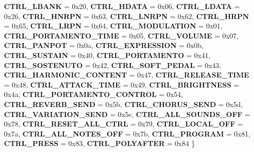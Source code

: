 \begin{DoxyCompactItemize}
{\bfseries C\+T\+R\+L\+\_\+\+L\+B\+A\+NK} = 0x20, 
{\bfseries C\+T\+R\+L\+\_\+\+H\+D\+A\+TA} = 0x06, 
{\bfseries C\+T\+R\+L\+\_\+\+L\+D\+A\+TA} = 0x26, 
\newline
{\bfseries C\+T\+R\+L\+\_\+\+H\+N\+R\+PN} = 0x63, 
{\bfseries C\+T\+R\+L\+\_\+\+L\+N\+R\+PN} = 0x62, 
{\bfseries C\+T\+R\+L\+\_\+\+H\+R\+PN} = 0x65, 
{\bfseries C\+T\+R\+L\+\_\+\+L\+R\+PN} = 0x64, 
\newline
{\bfseries C\+T\+R\+L\+\_\+\+M\+O\+D\+U\+L\+A\+T\+I\+ON} = 0x01, 
{\bfseries C\+T\+R\+L\+\_\+\+P\+O\+R\+T\+A\+M\+E\+N\+T\+O\+\_\+\+T\+I\+ME} = 0x05, 
{\bfseries C\+T\+R\+L\+\_\+\+V\+O\+L\+U\+ME} = 0x07, 
{\bfseries C\+T\+R\+L\+\_\+\+P\+A\+N\+P\+OT} = 0x0a, 
\newline
{\bfseries C\+T\+R\+L\+\_\+\+E\+X\+P\+R\+E\+S\+S\+I\+ON} = 0x0b, 
{\bfseries C\+T\+R\+L\+\_\+\+S\+U\+S\+T\+A\+IN} = 0x40, 
{\bfseries C\+T\+R\+L\+\_\+\+P\+O\+R\+T\+A\+M\+E\+N\+TO} = 0x41, 
{\bfseries C\+T\+R\+L\+\_\+\+S\+O\+S\+T\+E\+N\+U\+TO} = 0x42, 
\newline
{\bfseries C\+T\+R\+L\+\_\+\+S\+O\+F\+T\+\_\+\+P\+E\+D\+AL} = 0x43, 
{\bfseries C\+T\+R\+L\+\_\+\+H\+A\+R\+M\+O\+N\+I\+C\+\_\+\+C\+O\+N\+T\+E\+NT} = 0x47, 
{\bfseries C\+T\+R\+L\+\_\+\+R\+E\+L\+E\+A\+S\+E\+\_\+\+T\+I\+ME} = 0x48, 
{\bfseries C\+T\+R\+L\+\_\+\+A\+T\+T\+A\+C\+K\+\_\+\+T\+I\+ME} = 0x49, 
\newline
{\bfseries C\+T\+R\+L\+\_\+\+B\+R\+I\+G\+H\+T\+N\+E\+SS} = 0x4a, 
{\bfseries C\+T\+R\+L\+\_\+\+P\+O\+R\+T\+A\+M\+E\+N\+T\+O\+\_\+\+C\+O\+N\+T\+R\+OL} = 0x54, 
{\bfseries C\+T\+R\+L\+\_\+\+R\+E\+V\+E\+R\+B\+\_\+\+S\+E\+ND} = 0x5b, 
{\bfseries C\+T\+R\+L\+\_\+\+C\+H\+O\+R\+U\+S\+\_\+\+S\+E\+ND} = 0x5d, 
\newline
{\bfseries C\+T\+R\+L\+\_\+\+V\+A\+R\+I\+A\+T\+I\+O\+N\+\_\+\+S\+E\+ND} = 0x5e, 
{\bfseries C\+T\+R\+L\+\_\+\+A\+L\+L\+\_\+\+S\+O\+U\+N\+D\+S\+\_\+\+O\+FF} = 0x78, 
{\bfseries C\+T\+R\+L\+\_\+\+R\+E\+S\+E\+T\+\_\+\+A\+L\+L\+\_\+\+C\+T\+RL} = 0x79, 
{\bfseries C\+T\+R\+L\+\_\+\+L\+O\+C\+A\+L\+\_\+\+O\+FF} = 0x7a, 
\newline
{\bfseries C\+T\+R\+L\+\_\+\+A\+L\+L\+\_\+\+N\+O\+T\+E\+S\+\_\+\+O\+FF} = 0x7b, 
{\bfseries C\+T\+R\+L\+\_\+\+P\+R\+O\+G\+R\+AM} = 0x81, 
{\bfseries C\+T\+R\+L\+\_\+\+P\+R\+E\+SS} = 0x83, 
{\bfseries C\+T\+R\+L\+\_\+\+P\+O\+L\+Y\+A\+F\+T\+ER} = 0x84
 \}
\end{DoxyCompactItemize}
